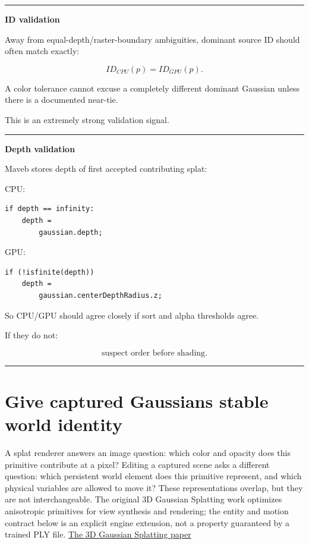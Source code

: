 \begin{center}\rule{0.5\linewidth}{0.5pt}\end{center}

\textbf{ID validation}

Away from equal-depth/raster-boundary ambiguities, dominant source ID should often match exactly:

\[
\boxed{
ID_{CPU}(p)=ID_{GPU}(p).
}
\]

A color tolerance cannot excuse a completely different dominant Gaussian unless there is a documented near-tie.

This is an extremely strong validation signal.

\begin{center}\rule{0.5\linewidth}{0.5pt}\end{center}

\textbf{Depth validation}

Maveb stores depth of first accepted contributing splat:

CPU:

\begin{verbatim}
if depth == infinity:
    depth =
        gaussian.depth;
\end{verbatim}

GPU:

\begin{verbatim}
if (!isfinite(depth))
    depth =
        gaussian.centerDepthRadius.z;
\end{verbatim}

So CPU/GPU should agree closely if sort and alpha thresholds agree.

If they do not:

\[
\boxed{
\text{suspect order before shading}.
}
\]

\begin{center}\rule{0.5\linewidth}{0.5pt}\end{center}

\section{Give captured Gaussians stable world identity}\label{04-visual-computing-ii-ch039-give-captured-gaussians-stable-world-identity}

A splat renderer answers an image question: which color and opacity does this primitive contribute at a pixel? Editing a captured scene asks a different question: which persistent world element does this primitive represent, and which physical variables are allowed to move it? These representations overlap, but they are not interchangeable. The original 3D Gaussian Splatting work optimizes anisotropic primitives for view synthesis and rendering; the entity and motion contract below is an explicit engine extension, not a property guaranteed by a trained PLY file. \href{https://arxiv.org/abs/2308.04079}{The 3D Gaussian Splatting paper}

